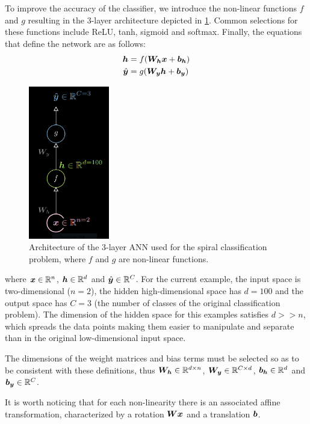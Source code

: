 To improve the accuracy of the classifier, we introduce the non-linear functions $f$ and $g$ resulting in the 3-layer architecture depicted in \cref{fig:3-layer_arch}.
Common selections for these functions include ReLU, tanh, sigmoid and softmax.
Finally, the equations that define the network are as follows:
\begin{align*}
    \vect{h} &= f(\matr{W}_{\vect{h}}\vect{x} + \vect{b}_{\vect{h}}) \\
    \hat{\vect{y}} &= g(\matr{W}_{\vect{y}}\vect{h} + \vect{b}_{\vect{y}})
\end{align*}

\begin{figure}[ht]
    \centering
    \includegraphics[width=100pt]{figs/architecture.png}
    \caption{Architecture of the 3-layer ANN used for the spiral classification problem, where $f$ and $g$ are non-linear functions.}
    \label{fig:3-layer_arch}
\end{figure}

where $\vect{x} \in \mathbb{R}^n$, $\vect{h} \in \mathbb{R}^d$ and $\hat{\vect{y}} \in \mathbb{R}^C$.
For the current example, the input space is two-dimensional ($n=2$), the hidden high-dimensional space has $d=100$ and the output space has $C=3$ (the number of classes of the original classification problem).
The dimension of the hidden space for this examples satisfies $d >> n$, which spreads the data points making them easier to manipulate and separate than in the original low-dimensional input space.

The dimensions of the weight matrices and bias terms must be selected so as to be consistent with these definitions, thus $\matr{W}_{\vect{h}} \in \mathbb{R}^{d \times n}$, $\matr{W}_{\vect{y}} \in \mathbb{R}^{C \times d}$, $\vect{b}_{\vect{h}} \in \mathbb{R}^d$ and $\vect{b}_{\vect{y}} \in \mathbb{R}^C$.

It is worth noticing that for each non-linearity there is an associated affine transformation, characterized by a rotation $\matr{W}\vect{x}$ and a translation $\vect{b}$.


